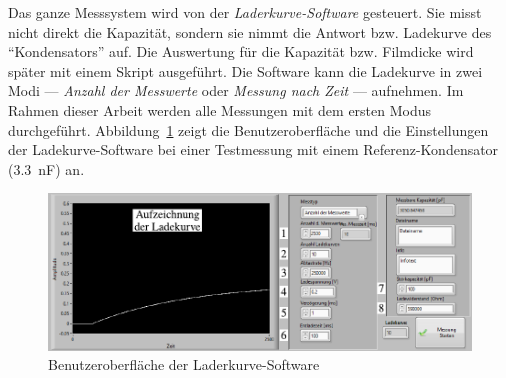 Das ganze Messsystem wird von der \textit{Laderkurve-Software} gesteuert.
Sie misst nicht direkt die Kapazität, sondern sie nimmt die Antwort bzw. Ladekurve des ``Kondensators'' auf.
Die Auswertung für die Kapazität bzw. Filmdicke wird später mit einem Skript ausgeführt.
Die Software kann die Ladekurve in zwei Modi --- \emph{Anzahl der Messwerte} oder \emph{Messung nach Zeit} --- aufnehmen.
Im Rahmen dieser Arbeit werden alle Messungen mit dem ersten Modus durchgeführt.
Abbildung~\ref{fig:gui_der_laderkurve_software} zeigt die Benutzeroberfläche und die Einstellungen der Ladekurve-Software bei einer Testmessung mit einem Referenz-Kondensator (\SI{3.3}{\nano\farad}) an.

\begin{figure}[htb]
    \centering
    \includegraphics[]{./images/ladekurven_gui.pdf}
    \caption{Benutzeroberfläche der Laderkurve-Software}
    \label{fig:gui_der_laderkurve_software}
\end{figure}

